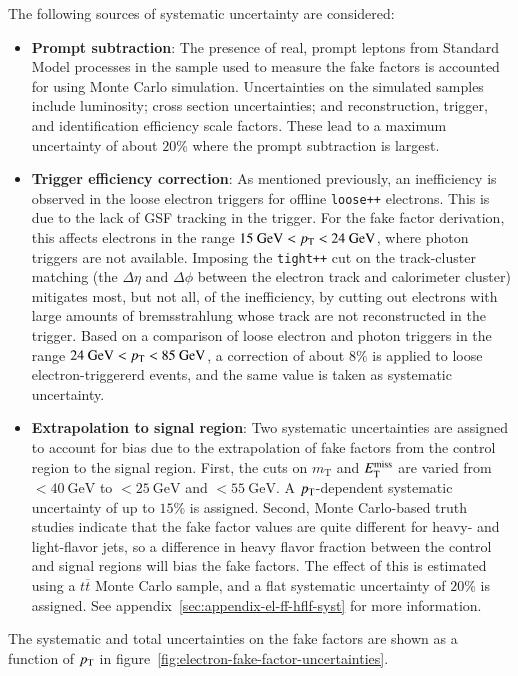 The following sources of systematic uncertainty are considered:
\begin{itemize}
  \item \textbf{Prompt subtraction}: The presence of real, prompt leptons from Standard Model processes in the sample used to measure the fake factors is accounted for using Monte Carlo simulation. Uncertainties on the simulated samples include luminosity; cross section uncertainties; and reconstruction, trigger, and identification efficiency scale factors. These lead to a maximum uncertainty of about $20\%$ where the prompt subtraction is largest. 
  \item \textbf{Trigger efficiency correction}: As mentioned previously, an inefficiency is observed in the loose electron triggers for offline \verb.loose++. electrons. This is due to the lack of GSF tracking in the trigger. For the fake factor derivation, this affects electrons in the range $15~\mbox{GeV}<p_{\text{T}}<24~\mbox{GeV}$, where photon triggers are not available. Imposing the \verb.tight++. cut on the track-cluster matching (the $\Delta \eta$ and $\Delta \phi$ between the electron track and calorimeter cluster) mitigates most, but not all, of the inefficiency, by cutting out electrons with large amounts of bremsstrahlung whose track are not reconstructed in the trigger. Based on a comparison of loose electron and photon triggers in the range $24~\mbox{GeV}<p_{\text{T}}<85~\mbox{GeV}$, a correction of about $8\%$ is applied to loose electron-triggererd events, and the same value is taken as systematic uncertainty.
  \item \textbf{Extrapolation to signal region}: Two systematic uncertainties are assigned to account for bias due to the extrapolation of fake factors from the control region to the signal region. First, the cuts on $m_{\mathrm{T}}$ and $E_{\text{T}}^{\text{miss}}$ are varied from $<40~\mbox{GeV}$ to $<25~\mbox{GeV}$ and $<55~\mbox{GeV}$. A $p_{\text{T}}$-dependent systematic uncertainty of up to $15\%$ is assigned. Second, Monte Carlo-based truth studies indicate that the fake factor values are quite different for heavy- and light-flavor jets, so a difference in heavy flavor fraction between the control and signal regions will bias the fake factors. The effect of this is estimated using a $t\overline{t}$ Monte Carlo sample, and a flat systematic uncertainty of $20\%$ is assigned. See appendix~\ref{sec:appendix-el-ff-hflf-syst} for more information.
\end{itemize}
The systematic and total uncertainties on the fake factors are shown as a function of $p_{\text{T}}$ in figure~\ref{fig:electron-fake-factor-uncertainties}.

